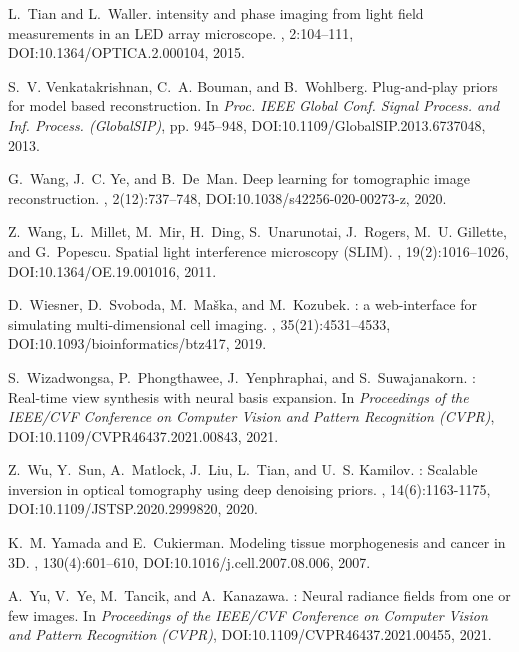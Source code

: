 \documentclass[11pt]{article}
\theoremstyle{plain} %
\begin{document}
\begin{thebibliography}{10}
L.~Tian and L.~Waller.
 intensity and phase imaging from light field measurements in an {LED} array microscope.
, 2:104--111,
\newblock DOI:10.1364/OPTICA.2.000104,
2015.

S.~V. Venkatakrishnan, C.~A. Bouman, and B.~Wohlberg.
\newblock Plug-and-play priors for model based reconstruction.
\newblock In {\em Proc. IEEE Global Conf. Signal Process. and Inf. Process. ({GlobalSIP})}, pp. 945--948,
\newblock DOI:10.1109/GlobalSIP.2013.6737048,
2013.

G.~Wang, J.~C. Ye, and B.~De~Man.
\newblock Deep learning for tomographic image reconstruction.
, 2(12):737--748,
\newblock DOI:10.1038/s42256-020-00273-z,
2020.

Z.~Wang, L.~Millet, M.~Mir, H.~Ding, S.~Unarunotai, J.~Rogers, M.~U. Gillette,
  and G.~Popescu.
\newblock Spatial light interference microscopy ({SLIM}).
, 19(2):1016--1026,
\newblock DOI:10.1364/OE.19.001016,
2011.

D.~Wiesner, D.~Svoboda, M.~Ma{\v s}ka, and M.~Kozubek.
: a web-interface for simulating multi-dimensional cell imaging.
, 35(21):4531--4533,
\newblock DOI:10.1093/bioinformatics/btz417,
2019.

S.~Wizadwongsa, P.~Phongthawee, J.~Yenphraphai, and S.~Suwajanakorn.
: Real-time view synthesis with neural basis expansion.
\newblock In {\em Proceedings of the IEEE/CVF Conference on Computer Vision and Pattern Recognition (CVPR)},
\newblock DOI:10.1109/CVPR46437.2021.00843,
2021.

Z.~{Wu}, Y.~{Sun}, A.~{Matlock}, J.~{Liu}, L.~{Tian}, and U.~S. {Kamilov}.
: Scalable inversion in optical tomography using deep denoising priors.
, 14(6):1163-1175,
\newblock DOI:10.1109/JSTSP.2020.2999820,
2020.

K.~M. Yamada and E.~Cukierman.
\newblock Modeling tissue morphogenesis and cancer in 3{D}.
, 130(4):601--610,
\newblock DOI:10.1016/j.cell.2007.08.006,
2007.

A.~Yu, V.~Ye, M.~Tancik, and A.~Kanazawa.
: Neural radiance fields from one or few images.
\newblock In {\em Proceedings of the IEEE/CVF Conference on Computer Vision and Pattern Recognition (CVPR)},
\newblock DOI:10.1109/CVPR46437.2021.00455,
2021.


\end{thebibliography}
\end{document}
